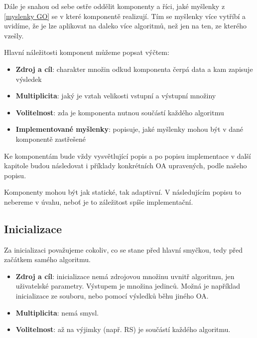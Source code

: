 Dále je snahou od sebe ostře oddělit komponenty a říci, jaké myšlenky z \ref{myslenky GO} se v které komponentě realizují. Tím se myšlenky více vytříbí a uvidíme, že je lze aplikovat na daleko více algoritmů, než jen na ten, ze kterého vzešly.

Hlavní náležitosti komponent můžeme popsat výčtem:
\begin{itemize}
  \item \textbf{Zdroj a cíl}: charakter množin odkud komponenta čerpá data a kam zapisuje výsledek
  \item \textbf{Multiplicita}: jaký je vztah velikosti vstupní a výstupní množiny
  \item \textbf{Volitelnost}: zda je komponenta nutnou součástí každého algoritmu
  \item \textbf{Implementované myšlenky}: popisuje, jaké myšlenky mohou být v dané komponentě zastřešené
\end{itemize}
Ke komponentám bude vždy vysvětlující popis a po popisu implementace v další kapitole budou následovat i příklady konkrétních OA upravených, podle našeho popisu.

Komponenty mohou být jak statické, tak adaptivní. V následujícím popisu to nebereme v úvahu, neboť je to záležitost spíše implementační.


\subsection{Inicializace}

Za inicializaci považujeme cokoliv, co se stane před hlavní smyčkou, tedy před začátkem samého algoritmu.
\begin{itemize}
  \item \textbf{Zdroj a cíl}: inicializace nemá zdrojovou množinu uvnitř algoritmu, jen uživatelské parametry. Výstupem je množina jedinců. Možná je například inicializace ze souboru, nebo pomocí výsledků běhu jiného OA.
  \item \textbf{Multiplicita}: nemá smysl.
  \item \textbf{Volitelnost}: až na výjimky (např. RS) je součástí každého algoritmu.
\end{itemize}

